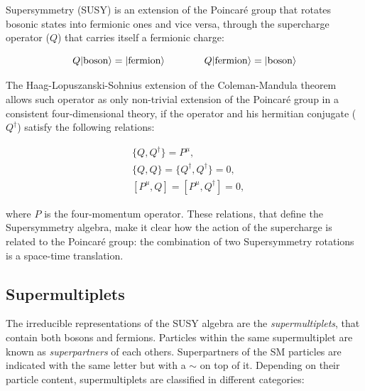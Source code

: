 Supersymmetry (SUSY) \cite{Wess:1974tw}\cite{Salam:1974ig} is an extension of the Poincar\'e group that rotates bosonic states into fermionic ones and vice versa, through the supercharge operator ($Q$) that carries itself a fermionic charge: 

\begin{equation}
Q |{\rm boson}\rangle = |{\rm fermion }\rangle \qquad\qquad
Q |{\rm fermion}\rangle = |{\rm boson }\rangle 
\end{equation}

The Haag-Lopuszanski-Sohnius extension of the Coleman-Mandula theorem \cite{HAAG1975257} allows such operator as only non-trivial extension of the Poincar\'e group in a consistent four-dimensional theory, if the operator and his hermitian conjugate ($Q^\dagger$) satisfy the following relations:

\begin{equation}
\begin{aligned}
&\{ Q, Q^\dagger \} = P^\mu ,  \\
&\{ Q,Q \} = \{ Q^\dagger , Q^\dagger \} = 0 ,  \\
&[ P^\mu , Q  ] = [P^\mu, Q^\dagger ] = 0 ,
\label{eq:susyalgth}
\end{aligned}
\end{equation}

where $P$ is the four-momentum operator. These relations, that define the Supersymmetry algebra, make it clear how the action of the supercharge is related to the Poincar\'e group: the combination of two Supersymmetry rotations is a space-time translation.

\subsection{Supermultiplets}

The irreducible representations of the SUSY algebra are the \textit{supermultiplets}, that contain both bosons and fermions. Particles within the same supermultiplet are known as \textit{superpartners} of each others. Superpartners of the SM particles are indicated with the same letter but with a $\sim$ on top of it. Depending on their particle content, supermultiplets are classified in different categories:

